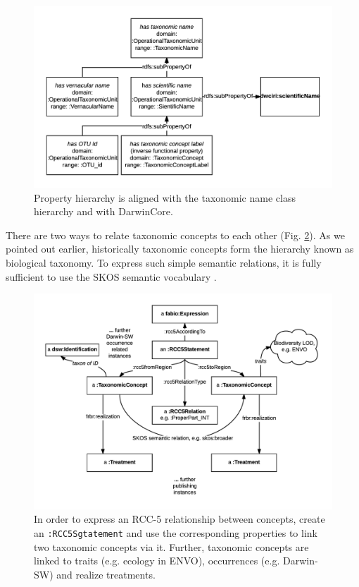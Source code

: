 \begin{figure}[h!]
\centering
  \includegraphics[width=\textwidth]{Figures/name-property-hierarchy}
  \decoRule
  \caption[Taxonomic name property hierarchy diagram.]
  {Property hierarchy is aligned with the taxonomic name class hierarchy and with DarwinCore.}
  \label{name-property-hierarchy}
\end{figure}

There are two ways to relate taxonomic concepts to each other (Fig. \ref{taxonomic-concept-relationships-diagram}). As we pointed out earlier, historically taxonomic concepts form the hierarchy known as biological taxonomy. To express such simple semantic relations, it is fully sufficient to use the SKOS semantic vocabulary \cite{miles_skos_nodate}. 

\begin{figure}[h!]
\centering
  \includegraphics[width=\textwidth]{Figures/taxonomic-concept-relationships-diagram}
  \decoRule
  \caption[Taxonomic concept relationships diagram.]{In order to express an RCC-5 relationship between concepts, create an {\tt :RCC5Sgtatement} and use the corresponding properties to link two taxonomic concepts via it. Further, taxonomic concepts are linked to traits (e.g. ecology in ENVO), occurrences (e.g. Darwin-SW) and realize treatments.}
  \label{taxonomic-concept-relationships-diagram}
\end{figure}

